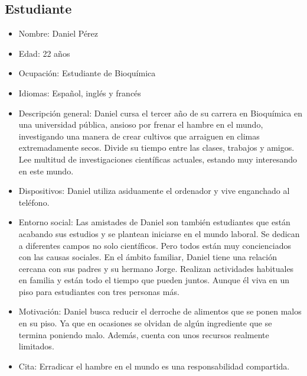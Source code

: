 \subsection{Estudiante}
\begin{itemize}
    \item Nombre: Daniel Pérez
    \item Edad: 22 años
    \item Ocupación: Estudiante de Bioquímica
    \item Idiomas: Español, inglés y francés
    \item Descripción general: Daniel cursa el tercer año de su carrera en Bioquímica en una universidad pública, ansioso por frenar el hambre en el mundo, investigando una manera de crear cultivos que arraiguen en climas extremadamente secos. Divide su tiempo entre las clases, trabajos y amigos. Lee multitud de investigaciones científicas actuales, estando muy interesando en este mundo.
    \item Dispositivos: Daniel utiliza asiduamente el ordenador y vive enganchado al teléfono.
    \item Entorno social: Las amistades de Daniel son también estudiantes que están acabando sus estudios y se plantean iniciarse en el mundo laboral. Se dedican a diferentes campos no solo científicos. Pero todos están muy concienciados con las causas sociales. En el ámbito familiar, Daniel tiene una relación cercana con sus padres y su hermano Jorge. Realizan actividades habituales en familia y están todo el tiempo que pueden juntos. Aunque él viva en un piso para estudiantes con tres personas más.
    \item Motivación: Daniel busca reducir el derroche de alimentos que se ponen malos en su piso. Ya que en ocasiones se olvidan de algún ingrediente que se termina poniendo malo. Además, cuenta con unos recursos realmente limitados. 
    \item Cita: Erradicar el hambre en el mundo es una responsabilidad compartida.
\end{itemize}

